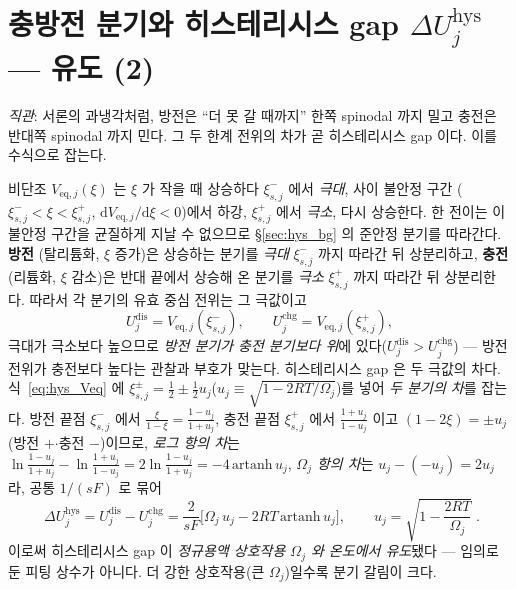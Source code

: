 \documentclass[11pt,a4paper]{article}
\newcommand{\dd}{\mathrm{d}}
\newcommand{\eq}{\mathrm{eq}}
\newcommand{\dis}{\mathrm{dis}}
\newcommand{\chg}{\mathrm{chg}}
\newcommand{\hys}{\mathrm{hys}}
\begin{document}
\section{충방전 분기와 히스테리시스 gap $\Delta U_j^\hys$ — 유도 (2)}\label{sec:hys_branch}
\emph{직관}: 서론의 과냉각처럼, 방전은 ``더 못 갈 때까지'' 한쪽 spinodal 까지 밀고 충전은 반대쪽 spinodal 까지
민다. 그 두 한계 전위의 차가 곧 히스테리시스 gap 이다. 이를 수식으로 잡는다.

비단조 $V_{\eq,j}(\xi)$ 는 $\xi$ 가 작을 때 상승하다 $\xi_{s,j}^-$ 에서 \emph{극대}, 사이 불안정 구간
($\xi_{s,j}^-<\xi<\xi_{s,j}^+$, $\dd V_{\eq,j}/\dd\xi<0$)에서 하강, $\xi_{s,j}^+$ 에서 \emph{극소}, 다시 상승한다.
한 전이는 이 불안정 구간을 균질하게 지날 수 없으므로 \S\ref{sec:hys_bg} 의 준안정 분기를 따라간다. \textbf{방전}
(탈리튬화, $\xi$ 증가)은 상승하는 분기를 \emph{극대} $\xi_{s,j}^-$ 까지 따라간 뒤 상분리하고, \textbf{충전}
(리튬화, $\xi$ 감소)은 반대 끝에서 상승해 온 분기를 \emph{극소} $\xi_{s,j}^+$ 까지 따라간 뒤 상분리한다. 따라서
각 분기의 유효 중심 전위는 그 극값이고
\begin{equation}
U_j^\dis=V_{\eq,j}(\xi_{s,j}^-),\qquad U_j^\chg=V_{\eq,j}(\xi_{s,j}^+),
\label{eq:hys_branchU}
\end{equation}
극대가 극소보다 높으므로 \emph{방전 분기가 충전 분기보다 위}에 있다($U_j^\dis>U_j^\chg$) — 방전 전위가 충전보다
높다는 관찰과 부호가 맞는다. 히스테리시스 gap 은 두 극값의 차다. 식~\eqref{eq:hys_Veq} 에 $\xi_{s,j}^\pm
=\tfrac12\pm\tfrac12 u_j$($u_j\equiv\sqrt{1-2RT/\Omega_j}$)를 넣어 \emph{두 분기의 차}를 잡는다. 방전 끝점
$\xi_{s,j}^-$ 에서 $\tfrac{\xi}{1-\xi}=\tfrac{1-u_j}{1+u_j}$, 충전 끝점 $\xi_{s,j}^+$ 에서 $\tfrac{1+u_j}{1-u_j}$ 이고
$(1-2\xi)=\pm u_j$(방전 $+$$\cdot$충전 $-$)이므로, \emph{로그 항의 차}는
$\ln\tfrac{1-u_j}{1+u_j}-\ln\tfrac{1+u_j}{1-u_j}=2\ln\tfrac{1-u_j}{1+u_j}=-4\,\mathrm{artanh}\,u_j$,
\emph{$\Omega_j$ 항의 차}는 $u_j-(-u_j)=2u_j$ 라, 공통 $1/(sF)$ 로 묶어
\begin{equation}
\boxed{\;\Delta U_j^\hys=U_j^\dis-U_j^\chg=\frac{2}{sF}\Big[\Omega_j\,u_j-2RT\,\mathrm{artanh}\,u_j\Big],
\qquad u_j=\sqrt{1-\frac{2RT}{\Omega_j}}\;.}
\label{eq:hys_dU}
\end{equation}
이로써 히스테리시스 gap 이 \emph{정규용액 상호작용 $\Omega_j$ 와 온도에서 유도}됐다 — 임의로 둔 피팅 상수가
아니다. 더 강한 상호작용(큰 $\Omega_j$)일수록 분기 갈림이 크다.
\end{document}
